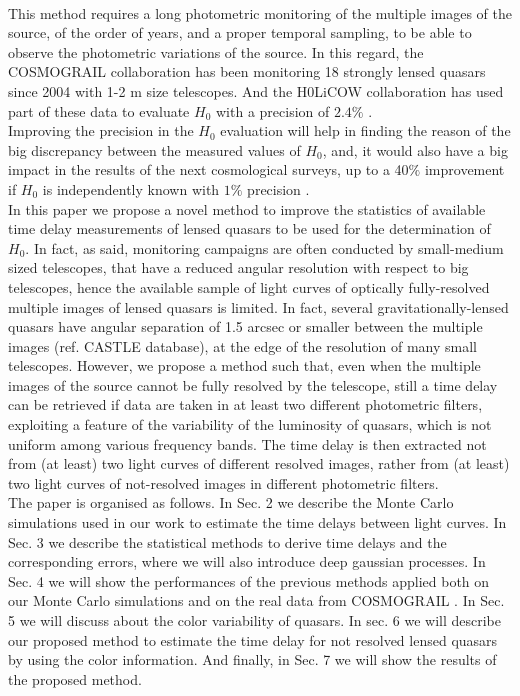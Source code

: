 \documentclass[twoside,twocolumn]{article}
\begin{document}
\\
This method requires a long photometric monitoring of the multiple images of the source, of the order of years, and a proper temporal sampling, to be able to observe the photometric variations of the source. In this regard, the COSMOGRAIL \cite{Cosmograil2020} collaboration has been monitoring 18 strongly lensed quasars since 2004  with 1-2 m size telescopes. And the H0LiCOW collaboration has used part of these data to evaluate $H_0$ with a precision of $2.4\%$ \cite{H0licow_XIII}. 
\\
Improving the precision in the $H_0$ evaluation will help in finding the reason of the big discrepancy between the measured values of $H_0$, and, it would also have a big impact in the results of the next cosmological surveys, up to a 40$\%$ improvement if $H_0$ is independently known with $1\%$ precision \cite{Weinberg2013}.
\\
In this paper we propose a novel method to improve the statistics of available time delay measurements of lensed quasars to be used for the determination of $H_0$. In fact, as said, monitoring campaigns are often conducted by small-medium sized telescopes, that have a reduced angular resolution with respect to big telescopes, hence the available sample of light curves of optically fully-resolved multiple images of lensed quasars is limited. In fact, several gravitationally-lensed quasars have angular separation of 1.5 arcsec or smaller between the multiple images (ref. CASTLE database), at the edge of the resolution of many small telescopes. However, we propose a method such that, even when the multiple images of the source cannot be fully resolved by the telescope, still a time delay can be retrieved if data are taken in at least two different photometric filters, exploiting a feature of the variability of the luminosity of quasars, which is not uniform among various frequency bands. The time delay is then extracted not from (at least) two light curves of different resolved images, rather from (at least) two light curves of not-resolved images in different photometric filters. 
\\
The paper is organised as follows. In Sec. 2 we describe the Monte Carlo simulations used in our work to estimate the time delays between light curves. In Sec. 3 we describe the statistical methods to derive time delays and the corresponding errors, where we will also introduce deep gaussian processes. In Sec. 4 we will show the performances of the previous methods applied both on our Monte Carlo simulations and on the real data from COSMOGRAIL \cite{Cosmograil2020}. In Sec. 5 we will discuss about the color variability of quasars. In sec. 6 we will describe our proposed method to estimate the time delay for not resolved lensed quasars by using the color information. And finally, in Sec. 7 we will show the results of the proposed method.
\end{document}
